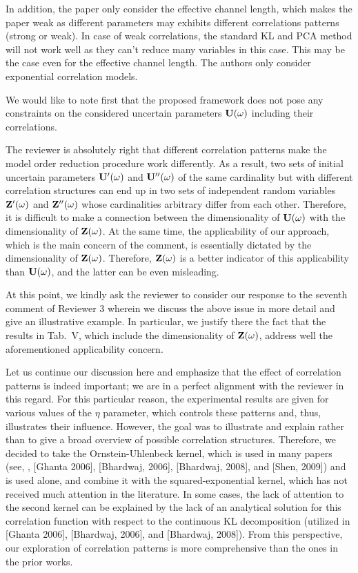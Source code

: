 \begin{reviewer}
[Comment 4] In addition, the paper only consider the effective channel length, which makes the paper weak as different parameters may exhibits different correlations patterns (strong or weak). In case of weak correlations, the standard KL and PCA method will not work well as they can’t reduce many variables in this case. This may be the case even for the effective channel length. The authors only consider exponential correlation models.
\end{reviewer}
\begin{authors}
We would like to note first that the proposed framework does not pose any constraints on the considered uncertain parameters $\mathbf{U}(\omega)$ including their correlations.

The reviewer is absolutely right that different correlation patterns make the model order reduction procedure work differently.
As a result, two sets of initial uncertain parameters $\mathbf{U}'(\omega)$ and $\mathbf{U}''(\omega)$ of the same cardinality but with different correlation structures can end up in two sets of independent random variables $\mathbf{Z}'(\omega)$ and $\mathbf{Z}''(\omega)$ whose cardinalities arbitrary differ from each other.
Therefore, it is difficult to make a connection between the dimensionality of $\mathbf{U}(\omega)$ with the dimensionality of $\mathbf{Z}(\omega)$.
At the same time, the applicability of our approach, which is the main concern of the comment, is essentially dictated by the dimensionality of $\mathbf{Z}(\omega)$.
Therefore, $\mathbf{Z}(\omega)$ is a better indicator of this applicability than $\mathbf{U}(\omega)$, and the latter can be even misleading.

At this point, we kindly ask the reviewer to consider our response to the seventh comment of Reviewer 3 wherein we discuss the above issue in more detail and give an illustrative example.
In particular, we justify there the fact that the results in Tab.~V, which include the dimensionality of $\mathbf{Z}(\omega)$, address well the aforementioned applicability concern.

Let us continue our discussion here and emphasize that the effect of correlation patterns is indeed important; we are in a perfect alignment with the reviewer in this regard.
For this particular reason, the experimental results are given for various values of the $\eta$ parameter, which controls these patterns and, thus, illustrates their influence.
However, the goal was to illustrate and explain rather than to give a broad overview of possible correlation structures.
Therefore, we decided to take the Ornstein-Uhlenbeck kernel, which is used in many papers (see, \eg, [Ghanta 2006], [Bhardwaj, 2006], [Bhardwaj, 2008], and [Shen, 2009]) and is used alone, and combine it with the squared-exponential kernel, which has not received much attention in the literature.
In some cases, the lack of attention to the second kernel can be explained by the lack of an analytical solution for this correlation function with respect to the continuous KL decomposition (utilized in [Ghanta 2006], [Bhardwaj, 2006], and [Bhardwaj, 2008]).
From this perspective, our exploration of correlation patterns is more comprehensive than the ones in the prior works.


\end{authors}
